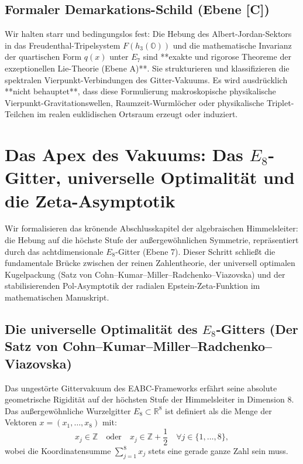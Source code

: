 \documentclass[11pt,a4paper]{article}
\theoremstyle{definition}
\begin{document}
	\subsection{Formaler Demarkations-Schild (Ebene [C])}
	Wir halten starr und bedingungslos fest:
	Die Hebung des Albert-Jordan-Sektors in das Freudenthal-Tripelsystem $F(h_3(\mathbb{O}))$ und die mathematische Invarianz der quartischen Form $q(x)$ unter $E_7$ sind **exakte und rigorose Theoreme der exzeptionellen Lie-Theorie (Ebene A)**. Sie strukturieren und klassifizieren die spektralen Vierpunkt-Verbindungen des Gitter-Vakuums. Es wird ausdrücklich **nicht behauptet**, dass diese Formulierung makroskopische physikalische Vierpunkt-Gravitationswellen, Raumzeit-Wurmlöcher oder physikalische Triplet-Teilchen im realen euklidischen Ortsraum erzeugt oder induziert.
	
	
	\section{Das Apex des Vakuums: Das $E_8$-Gitter, universelle Optimalität und die Zeta-Asymptotik}
	\label{sec:e8_optimalitaet_zeta}
	
	Wir formalisieren das krönende Abschlusskapitel der algebraischen Himmelsleiter: die Hebung auf die höchste Stufe der außergewöhnlichen Symmetrie, repräsentiert durch das achtdimensionale $E_8$-Gitter (Ebene 7). Dieser Schritt schließt die fundamentale Brücke zwischen der reinen Zahlentheorie, der universell optimalen Kugelpackung (Satz von Cohn--Kumar--Miller--Radchenko--Viazovska) und der stabilisierenden Pol-Asymptotik der radialen Epstein-Zeta-Funktion im mathematischen Manuskript.
	
	\subsection{Die universelle Optimalität des $E_8$-Gitters (Der Satz von Cohn--Kumar--Miller--Radchenko--Viazovska)}
	Das ungestörte Gittervakuum des EABC-Frameworks erfährt seine absolute geometrische Rigidität auf der höchsten Stufe der Himmelsleiter in Dimension 8. Das außergewöhnliche Wurzelgitter $E_8 \subset \mathbb{R}^8$ ist definiert als die Menge der Vektoren $x = (x_1, \dots, x_8)$ mit:
	\begin{equation}
		x_j \in \mathbb{Z} \quad \text{oder} \quad x_j \in \mathbb{Z} + \frac{1}{2} \quad \forall j \in \{1, \dots, 8\},
	\end{equation}
	wobei die Koordinatensumme $\sum_{j=1}^8 x_j$ stets eine gerade ganze Zahl sein muss. 
	
\end{document}

